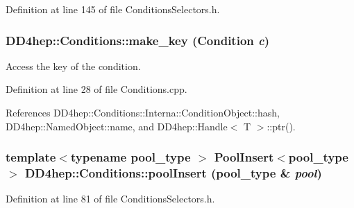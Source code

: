 Definition at line 145 of file ConditionsSelectors.h.\hypertarget{namespace_d_d4hep_1_1_conditions_a5d280367b77508df52c5caadc9d84abf}{
\subsubsection[{make\_\-key}]{ DD4hep::Conditions::make\_\-key ({\bf Condition} {\em c})}}
\label{namespace_d_d4hep_1_1_conditions_a5d280367b77508df52c5caadc9d84abf}


Access the key of the condition. 

Definition at line 28 of file Conditions.cpp.

References DD4hep::Conditions::Interna::ConditionObject::hash, DD4hep::NamedObject::name, and DD4hep::Handle$<$ T $>$::ptr().\hypertarget{namespace_d_d4hep_1_1_conditions_a23f0fbdfff63e698e4f151636b8c50d3}{
\subsubsection[{poolInsert}]{\setlength{\rightskip}{0pt plus 5cm}template$<$typename pool\_\-type $>$ {\bf PoolInsert}$<$pool\_\-type$>$ DD4hep::Conditions::poolInsert (pool\_\-type \& {\em pool})}}
\label{namespace_d_d4hep_1_1_conditions_a23f0fbdfff63e698e4f151636b8c50d3}


Definition at line 81 of file ConditionsSelectors.h.
